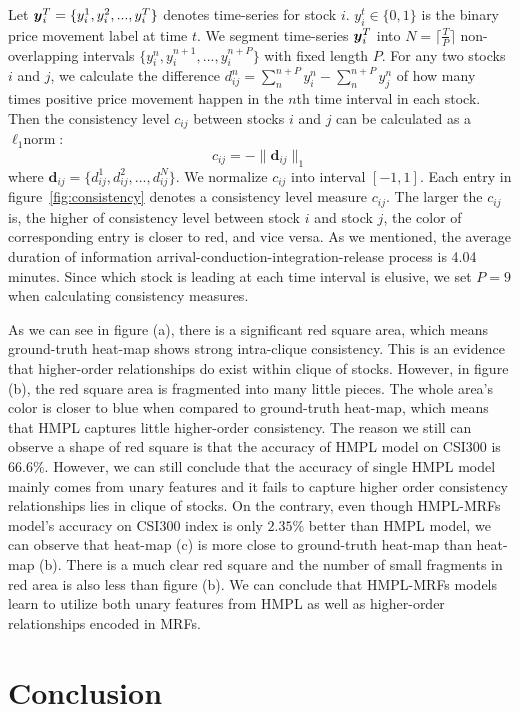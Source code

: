 \documentclass[sigconf,anonymous,review]{acmart}
\begin{document}
Let ${\boldsymbol{y}}_i^T=\{y_i^1,y_i^2,...,y_i^T\}$ denotes time-series for
stock $i$. $y_i^t\in \{0,1\}$ is the binary price movement label
at time $t$. We segment time-series ${\boldsymbol{y}}_i^T$ into
$N=\lceil\frac{T}{P}\rceil$ non-overlapping intervals
$\{y_i^n,y_i^{n+1},...,y_i^{n+P}\}$ with fixed length $P$. For
any two stocks $i$ and $j$, we calculate the difference
$d_{ij}^n=\sum_n^{n+P}{y_i^n}-\sum_n^{n+P}{y_j^n}$ of how many
times positive price movement happen in the $n$th time interval
in each stock. Then the consistency level $c_{ij}$ between stocks
$i$ and $j$ can be calculated as a $\ell_1\text{norm}$:
$$c_{ij}=-\|\mathbf{d}_{ij}\|_1$$
\noindent where
$\mathbf{d}_{ij}=\{d_{ij}^1,d_{ij}^2,...,d_{ij}^N\}$. We
normalize $c_{ij}$ into interval $[-1,1]$. Each entry in
figure~\ref{fig:consistency} denotes a consistency level measure
$c_{ij}$. The larger the $c_{ij}$ is, the higher of consistency
level between stock $i$ and stock $j$, the color of corresponding
entry is closer to red, and vice versa. As we mentioned, the average duration of information
arrival-conduction-integration-release process is 4.04 minutes.
Since which stock is leading at each time interval is elusive, we
set $P=9$ when calculating consistency measures.

As we can see in figure (a), there is a significant red square
area, which means ground-truth heat-map shows strong intra-clique
consistency. This is an evidence that higher-order relationships
do exist within clique of stocks. However, in figure (b), the red
square area is fragmented into many little pieces. The whole
area's color is closer to blue when compared to ground-truth
heat-map, which means that HMPL captures little higher-order consistency.
The reason we still can observe a shape of red square
is that the accuracy of HMPL model on CSI300 is $66.6\%$.
However, we can still conclude that the accuracy of single HMPL
model mainly comes from unary features and it fails to capture
higher order consistency relationships lies in clique of stocks.
On the contrary, even though HMPL-MRFs model's accuracy on CSI300
index is only $2.35\%$ better than HMPL model, we can observe
that heat-map (c) is more close to ground-truth heat-map than
heat-map (b). There is a much clear red square and the number of
small fragments in red area is also less than figure (b). We can
conclude that HMPL-MRFs models learn to utilize both unary
features from HMPL as well as higher-order relationships encoded
in MRFs.

\vspace{-3mm}
\section{Conclusion}
\label{sec:conc}
\end{document}
